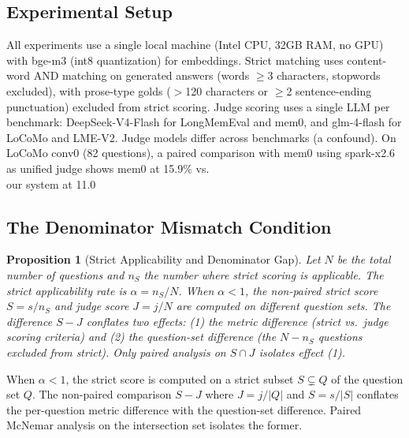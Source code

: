 \documentclass{llncs}
\newtheorem{propositionx}{Proposition}
\begin{document}
\subsection{Experimental Setup}
All experiments use a single local machine (Intel CPU, 32GB RAM, no GPU) with bge-m3 (int8 quantization) for embeddings. Strict matching uses content-word AND matching on generated answers (words $\geq$3 characters, stopwords excluded), with prose-type golds ($>$120 characters or $\geq$2 sentence-ending punctuation) excluded from strict scoring. Judge scoring uses a single LLM per benchmark: DeepSeek-V4-Flash for LongMemEval and mem0, and glm-4-flash for LoCoMo and LME-V2. Judge models differ across benchmarks (a confound). On LoCoMo conv0 (82 questions), a paired comparison with mem0 using spark-x2.6 as unified judge shows mem0 at 15.9\% vs.\\ our system at 11.0\\%

\subsection{The Denominator Mismatch Condition}

\begin{propositionx}[Strict Applicability and Denominator Gap]

Let $N$ be the total number of questions and $n_S$ the number where strict scoring is applicable. The strict applicability rate is $\alpha = n_S / N$. When $\alpha < 1$, the non-paired strict score $S = s/n_S$ and judge score $J = j/N$ are computed on different question sets. The difference $S - J$ conflates two effects: (1) the metric difference (strict vs.\ judge scoring criteria) and (2) the question-set difference (the $N - n_S$ questions excluded from strict). Only paired analysis on $S \cap J$ isolates effect (1).
\end{propositionx}
When $\alpha < 1$, the strict score is computed on a strict subset $S \subsetneq Q$ of the question set $Q$. The non-paired comparison $S - J$ where $J = j/|Q|$ and $S = s/|S|$ conflates the per-question metric difference with the question-set difference. Paired McNemar analysis on the intersection set isolates the former.
\end{document}
